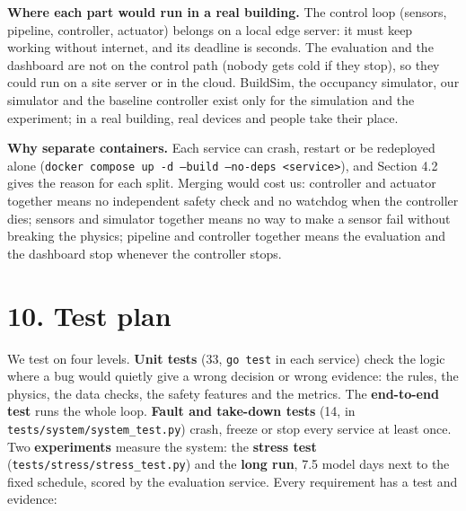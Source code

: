 \documentclass[11pt]{article}
\begin{document}
\textbf{Where each part would run in a real building.} The control loop (sensors, pipeline,
controller, actuator) belongs on a local edge server: it must keep working without internet, and
its deadline is seconds. The evaluation and the dashboard are not on the control path (nobody gets
cold if they stop), so they could run on a site server or in the cloud. BuildSim, the occupancy
simulator, our simulator and the baseline controller exist only for the simulation and the
experiment; in a real building, real devices and people take their place.

\textbf{Why separate containers.} Each service can crash, restart or be redeployed alone
(\texttt{docker compose up -d --build --no-deps <service>}), and Section 4.2 gives the reason for
each split. Merging would cost us: controller and actuator together means no independent safety
check and no watchdog when the controller dies; sensors and simulator together means no way to make
a sensor fail without breaking the physics; pipeline and controller together means the evaluation
and the dashboard stop whenever the controller stops.

\section{10. Test plan}\label{test-plan}

We test on four levels. \textbf{Unit tests} (33, \texttt{go test} in each service) check the logic
where a bug would quietly give a wrong decision or wrong evidence: the rules, the physics, the data
checks, the safety features and the metrics. The \textbf{end-to-end test} runs the whole loop.
\textbf{Fault and take-down tests} (14, in \texttt{tests/system/system\_test.py}) crash, freeze or
stop every service at least once. Two \textbf{experiments} measure the system: the \textbf{stress
test} (\texttt{tests/stress/stress\_test.py}) and the \textbf{long run}, 7.5 model days next to the
fixed schedule, scored by the evaluation service. Every requirement has a test and evidence:
\end{document}
